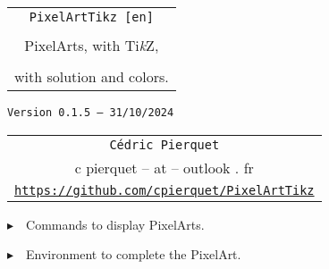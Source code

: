 \documentclass{article}
\def\TPversion{0.1.5}
\def\TPdate{31/10/2024}
\begin{document}
\pagestyle{fancy}

\thispagestyle{empty}

\vspace{2cm}

\begin{center}
	\begin{minipage}{0.75\linewidth}
	\begin{tcolorbox}[colframe=yellow,colback=yellow!15]
		\begin{center}
			\begin{tabular}{c}
				{\Huge \texttt{PixelArtTikz [en]}}\\
				\\
				{\LARGE PixelArts, with Ti\textit{k}Z}, \\
				\\
				{\LARGE with solution and colors.} \\
			\end{tabular}
			
			\medskip
			
			{\small \texttt{Version \TPversion{} -- \TPdate}}
		\end{center}
	\end{tcolorbox}
\end{minipage}
\end{center}

\vspace{0.5cm}

\begin{center}
	\begin{tabular}{c}
	\texttt{Cédric Pierquet}\\
	{\ttfamily c pierquet -- at -- outlook . fr}\\
	\texttt{\url{https://github.com/cpierquet/PixelArtTikz}}
\end{tabular}
\end{center}

\vspace{0.25cm}

{$\blacktriangleright$~~Commands to display PixelArts.}

\smallskip

{$\blacktriangleright$~~Environment to complete the PixelArt.}

\smallskip

\vspace{1cm}
\end{document}
